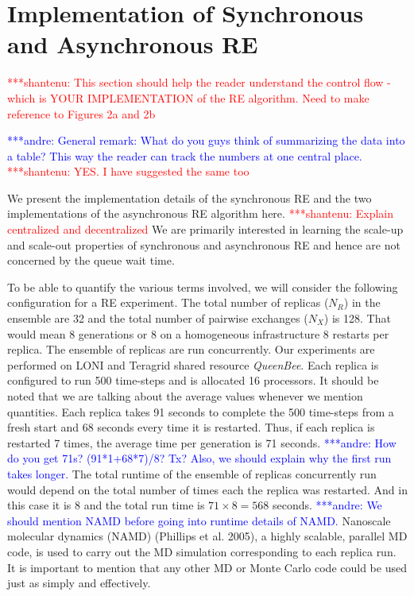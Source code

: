\documentclass{rspublic}
\newcommand{\jhanote}[1]{ {\textcolor{red} { ***shantenu: #1 }}}
\newcommand{\alnote}[1]{ {\textcolor{blue} { ***andre: #1 }}}
\newcommand{\alnote}[1]{}
\newcommand{\jhanote}[1]{}
\begin{document}
\section{Implementation of Synchronous and Asynchronous RE}

\jhanote{This section should help the reader understand the control
  flow - which is YOUR IMPLEMENTATION of the RE algorithm. Need to
  make reference to Figures 2a and 2b}

\alnote{General remark: What do you guys think of summarizing the data into 
a table? This way the reader can track the numbers at one central place.}
\jhanote{YES. I have suggested the same too}

We present the implementation details of the synchronous RE and the
two implementations of the asynchronous RE algorithm here.
\jhanote{Explain centralized and decentralized} We are primarily
interested in learning the scale-up and scale-out properties of
synchronous and asynchronous RE and hence are not concerned by the
queue wait time. 

To be able to quantify the various terms involved, we will consider
the following configuration for a RE experiment. The total number of
replicas ($N_R$) in the ensemble are 32 and the total number of
pairwise exchanges ($N_X$) is 128. That would mean 8 generations or 8
on a homogeneous infrastructure 8 restarts per replica. The ensemble
of replicas are run concurrently. Our experiments are performed on
LONI and Teragrid shared resource \emph{QueenBee}. Each replica is
configured to run 500 time-steps and is allocated 16 processors. It
should be noted that we are talking about the average values whenever
we mention quantities. Each replica takes 91 seconds to complete the
500 time-steps from a fresh start and 68 seconds every time it is
restarted. Thus, if each replica is restarted 7 times, the average
time per generation is 71 seconds. \alnote{How do you get 71s?
  (91*1+68*7)/8? Tx?  Also, we should explain why the first run takes
  longer.}  The total runtime of the ensemble of replicas concurrently
run would depend on the total number of times each the replica was
restarted. And in this case it is 8 and the total run time is $71
\times 8 = 568$ seconds. \alnote{We should mention NAMD before going
  into runtime details of NAMD.}  Nanoscale molecular dynamics (NAMD)
(Phillips et al.  2005), a highly scalable, parallel MD code, is used
to carry out the MD simulation corresponding to each replica run. It
is important to mention that any other MD or Monte Carlo code could be
used just as simply and effectively.
\end{document}
